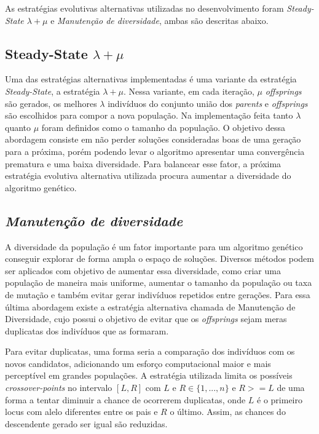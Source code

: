 \documentclass[11pt]{article}
\begin{document}
As estratégias evolutivas alternativas utilizadas no desenvolvimento foram \textit{Steady-State $\lambda +	\mu$} e \textit{Manutenção de diversidade}, ambas são descritas abaixo.

\subsection{Steady-State $\lambda +	\mu$}
Uma das estratégias alternativas implementadas é uma variante da estratégia \textit{Steady-State}, a estratégia $\lambda +	\mu$. Nessa variante, em cada iteração, $\mu$ \textit{offsprings} são gerados, os melhores  $\lambda$  indivíduos do conjunto união dos \textit{parents} e \textit{offsprings} são escolhidos para compor a nova população. Na implementação feita tanto $\lambda$ quanto $\mu$ foram definidos como o tamanho da população. O objetivo dessa abordagem consiste em não perder soluções consideradas boas de uma geração para a próxima, porém podendo levar o algoritmo apresentar uma convergência prematura e uma baixa diversidade. Para balancear esse fator, a próxima estratégia evolutiva alternativa utilizada procura aumentar a diversidade do algoritmo genético.

\subsection{\textit{Manutenção de diversidade}}
\label{sec:diversidade}

A diversidade da população é um fator importante para um algoritmo genético conseguir explorar de forma ampla o espaço de soluções. Diversos métodos podem ser aplicados com objetivo de aumentar essa diversidade, como criar uma população de maneira mais uniforme, aumentar o tamanho da população ou taxa de mutação e também evitar gerar indivíduos repetidos entre gerações. Para essa última abordagem existe a estratégia alternativa chamada de Manutenção de Diversidade, cujo possui o objetivo de evitar que os \textit{offsprings} sejam meras duplicatas dos indivíduos que as formaram. 

Para evitar duplicatas, uma forma seria a comparação dos indivíduos com os novos candidatos, adicionando um esforço computacional maior e mais perceptível em grandes populações. A estratégia utilizada limita os possíveis \textit{crossover-points} no intervalo $[L, R]$ com $L$ e $R \in \{1, ..., n\}$ e $R >= L$ de uma forma a tentar diminuir a chance de ocorrerem duplicatas, onde \(L\) é o primeiro locus com alelo diferentes entre os pais e \(R\) o último. Assim, as chances do descendente gerado ser igual são reduzidas.
\end{document}
